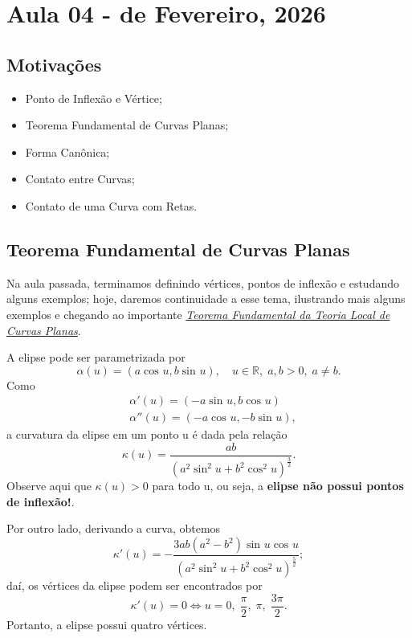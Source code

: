 \documentclass[../differential_geometry.tex]{subfiles}
\begin{document}
\section{Aula 04 - de Fevereiro, 2026}
\subsection{Motivações}
\begin{itemize}
	\item Ponto de Inflexão e Vértice;
	\item Teorema Fundamental de Curvas Planas;
	\item Forma Canônica;
	\item Contato entre Curvas;
	\item Contato de uma Curva com Retas.
\end{itemize}
\subsection{Teorema Fundamental de Curvas Planas}
Na aula passada, terminamos definindo vértices, pontos de inflexão e estudando alguns exemplos; hoje, daremos continuidade a esse tema, ilustrando mais alguns exemplos e chegando ao importante \hyperlink{fundamental_plane_curve}{\textit{Teorema Fundamental da Teoria Local de Curvas Planas}}.
\begin{example}[Elipse]
	A elipse pode ser parametrizada por
	\[
		\alpha (u)=(a\cos^{}{u}, b\sin^{}{u}), \quad u\in \mathbb{R},\; a, b>0,\; a\neq b.
	\]
	Como
	\begin{align*}
		 & \alpha '(u)=(-a \sin^{}{u}, b \cos^{}{u})  \\
		 & \alpha ''(u)=(-a\cos^{}{u}, -b\sin^{}{u}),
	\end{align*}
	a curvatura da elipse em um ponto u é dada pela relação
	\[
		\kappa (u)=\frac{ab}{(a^{2}\sin^{2}{u}+b^{2}\cos^{2}{u})^{\frac{3}{2}}}.
	\]
	Observe aqui que \(\kappa (u)>0\) para todo u, ou seja, a \textbf{elipse não possui pontos de inflexão!}.

	Por outro lado, derivando a curva, obtemos
	\[
		\kappa '(u)= - \frac{3ab(a^{2}-b^{2})\sin^{}{u}\cos^{}{u}}{(a^{2}\sin^{2}{u}+b^{2}\cos^{2}{u})^{\frac{5}{2}}};
	\]
	daí, os vértices da elipse podem ser encontrados por
	\[
		\kappa '(u)=0 \Longleftrightarrow u=0,\; \frac{\pi }{2},\; \pi ,\; \frac{3\pi }{2}.
	\]
	Portanto, a elipse possui quatro vértices.
\end{example}
\end{document}
